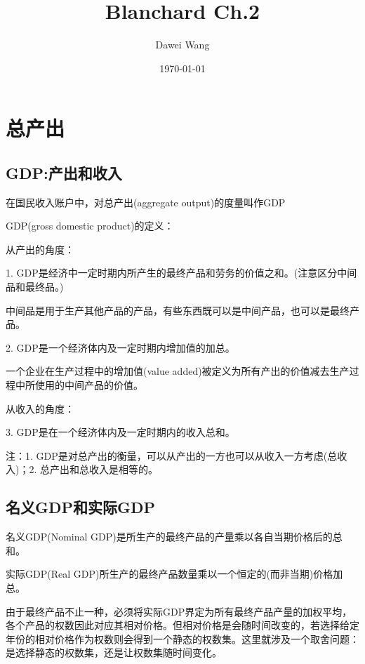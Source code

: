 \documentclass{article}
\title{Blanchard Ch.2}
\author{Dawei Wang}
\date{\today}
\begin{document}
	\maketitle
\section{总产出}
\subsection{GDP:产出和收入}

在国民收入账户中，对总产出(aggregate output)的度量叫作GDP

GDP(gross domestic product)的定义：

\hspace*{\fill}

从产出的角度：

1. GDP是经济中一定时期内所产生的最终产品和劳务的价值之和。(注意区分中间品和最终品。)

中间品是用于生产其他产品的产品，有些东西既可以是中间产品，也可以是最终产品。


2. GDP是一个经济体内及一定时期内增加值的加总。

一个企业在生产过程中的增加值(value added)被定义为所有产出的价值减去生产过程中所使用的中间产品的价值。

\hspace*{\fill}

从收入的角度：

3. GDP是在一个经济体内及一定时期内的收入总和。

\hspace*{\fill}

注：1. GDP是对总产出的衡量，可以从产出的一方也可以从收入一方考虑(总收入)；2. 总产出和总收入是相等的。

\subsection{名义GDP和实际GDP}
名义GDP(Nominal GDP)是所生产的最终产品的产量乘以各自当期价格后的总和。

实际GDP(Real GDP)所生产的最终产品数量乘以一个恒定的(而非当期)价格加总。

由于最终产品不止一种，必须将实际GDP界定为所有最终产品产量的加权平均，各个产品的权数因此对应其相对价格。但相对价格是会随时间改变的，若选择给定年份的相对价格作为权数则会得到一个静态的权数集。这里就涉及一个取舍问题：是选择静态的权数集，还是让权数集随时间变化。

\hspace*{\fill}
\end{document}
